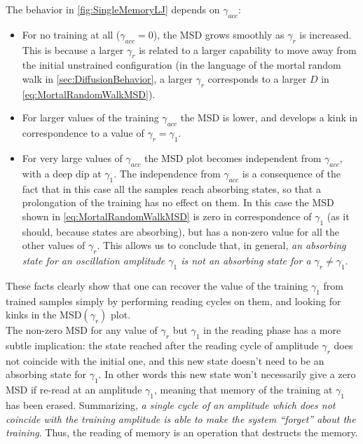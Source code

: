 The behavior in \autoref{fig:SingleMemoryLJ} depends on $\gamma_{acc}$:
\begin{itemize}
\item For no training at all ($\gamma_{acc} = 0$), the MSD grows smoothly as $\gamma_{r}$ is increased. This is because a larger $\gamma_{r}$ is related to a larger capability to move away from the initial unstrained configuration (in the language of the mortal random walk in \autoref{sec:DiffusionBehavior}, a larger $\gamma_{r}$ corresponds to a larger $D$ in \autoref{eq:MortalRandomWalkMSD}).
\item For larger values of the training $\gamma_{acc}$ the MSD is lower, and develops a kink in correspondence to a value of $\gamma_{r} = \gamma_{1}$. 
\item For very large values of $\gamma_{acc}$ the MSD plot becomes independent from $\gamma_{acc}$, with a deep dip at $\gamma_{1}$. The independence from $\gamma_{acc}$ is a consequence of the fact that in this case all the samples reach absorbing states, so that a prolongation of the training has no effect on them.
In this case the MSD shown in \autoref{eq:MortalRandomWalkMSD} is zero in correspondence of $\gamma_{1}$ (as it should, because states are absorbing), but has a non-zero value for all the other values of $\gamma_{r}$. This allows us to conclude that, in general, \emph{an absorbing state for an oscillation amplitude $\gamma_{1}$ is not an absorbing state for a $\gamma_{r} \neq \gamma_{1}$}. 
\end{itemize}

These facts clearly show that one can recover the value of the training $\gamma_{1}$ from trained samples simply by performing reading cycles on them, and looking for kinks in the MSD$(\gamma_{r})$ plot.\\
The non-zero MSD for any value of $\gamma_{r}$ but $\gamma_{1}$ in the reading phase has a more subtle implication: the state reached after the reading cycle of amplitude $\gamma_{r}$ does not coincide with the initial one, and this new state doesn't need to be an absorbing state for $\gamma_{1}$. In other words this new state won't necessarily give a zero MSD if re-read at an amplitude $\gamma_{1}$, meaning that memory of the training at $\gamma_{1}$ has been erased. Summarizing, \emph{a single cycle of an amplitude which does not coincide with the training amplitude is able to make the system ``forget'' about the training}. Thus, the reading of memory is an operation that destructs the memory.\\

